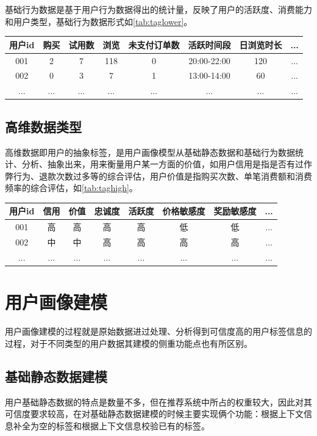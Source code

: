   基础行为数据是基于用户行为数据得出的统计量，反映了用户的活跃度、消费能力和用户类型，基础行为数据形式如\autoref{tab:taglower}。
    \begin{table}[htp]
    \centering
    \label{tab:taglower}
    \begin{tabular}{|c|c|c|c|c|c|c|c|} \hline
     用户id & 购买 & 试用数 & 浏览 & 未支付订单数 & 活跃时间段 & 日浏览时长 & ... \\ \hline
     001 & 2 & 7 & 118 & 0 & 20:00-22:00 & 120 & ... \\ \hline
     002 & 0 & 3 & 7 & 1 & 13:00-14:00 & 60 & ... \\ \hline
     ... & ... & ... & ... & ... & ... & ... & ... \\ \hline
    \end{tabular}
    \end{table}

  \subsection{高维数据类型}
  高维数据即用户的抽象标签，是用户画像模型从基础静态数据和基础行为数据统计、分析、抽象出来，用来衡量用户某一方面的价值，如用户信用是指是否有过作弊行为、退款次数过多等的综合评估，用户价值是指购买次数、单笔消费额和消费频率的综合评估，如\autoref{tab:taghigh}。
    \begin{table}[htp]
    \centering
    \label{tab:taghigh}
    \begin{tabular}{|c|c|c|c|c|c|c|c|} \hline
     用户id & 信用 & 价值 & 忠诚度 & 活跃度 & 价格敏感度 & 奖励敏感度 & ... \\ \hline
     001 & 高 & 高 & 高 & 高 & 低 & 低 & ... \\ \hline
     002 & 中 & 中 & 高 & 高 & 高 & 高 & ... \\ \hline
     ... & ... & ... & ... & ... & ... & ... & ... \\ \hline
    \end{tabular}
    \end{table}

  \section{用户画像建模}
  用户画像建模的过程就是原始数据进过处理、分析得到可信度高的用户标签信息的过程，对于不同类型的用户数据其建模的侧重功能点也有所区别。
  \subsection{基础静态数据建模}
  用户基础静态数据的特点是数量不多，但在推荐系统中所占的权重较大，因此对其可信度要求较高，在对基础静态数据建模的时候主要实现俩个功能：根据上下文信息补全为空的标签和根据上下文信息校验已有的标签。

